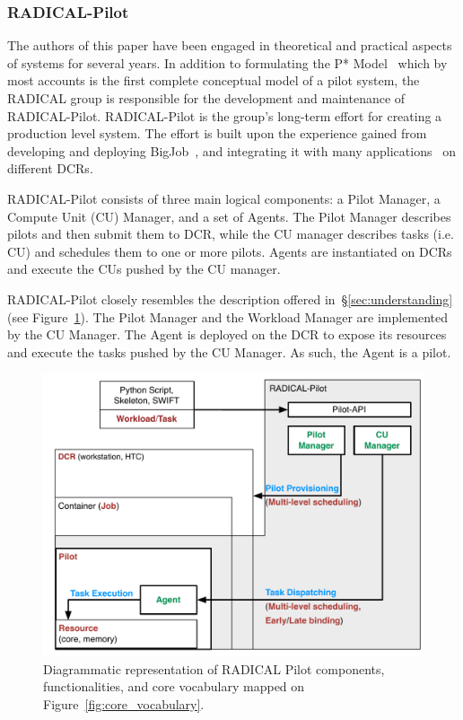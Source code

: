 \documentclass{sig-alternate}
\begin{document}
%
\subsubsection{RADICAL-Pilot}
\label{sec:radical_pilot}

The authors of this paper have been engaged in theoretical and practical aspects
of \pilot systems for several years. In addition to formulating the P*
Model~\cite{luckow2012} which by most accounts is the first complete conceptual
model of a pilot system, the RADICAL group is responsible for the development
and maintenance of RADICAL-Pilot\cite{merzky2015radical,rp_url}. RADICAL-Pilot
is the group's long-term effort for creating a production level \pilot system.
The effort is built upon the experience gained from developing and deploying
BigJob~\cite{luckow2010}, and integrating it with many
applications~\cite{ko2010efficient,kim2010exploring,ct500776j} on different
DCRs.

RADICAL-Pilot consists of three main logical components: a Pilot Manager, a
Compute Unit (CU) Manager, and a set of Agents. The Pilot Manager describes
pilots and then submit them to DCR, while the CU manager describes tasks (i.e.
CU) and schedules them to one or more pilots. Agents are instantiated on DCRs
and execute the CUs pushed by the CU manager.

RADICAL-Pilot closely resembles the description offered
in~\S\ref{sec:understanding} (see Figure~\ref{fig:rp_comparison}). The Pilot
Manager and the Workload Manager are implemented by the CU Manager. The Agent is
deployed on the DCR to expose its resources and execute the tasks pushed by the
CU Manager. As such, the Agent is a pilot.


\begin{figure}[t]
    \centering
        \includegraphics[width=.48\textwidth]{figures/radicalp_comparison.pdf}
    \caption{Diagrammatic representation of RADICAL Pilot components,
    functionalities, and core vocabulary mapped on
    Figure~\ref{fig:core_vocabulary}.}
    \label{fig:rp_comparison}
\end{figure}
\end{document}
